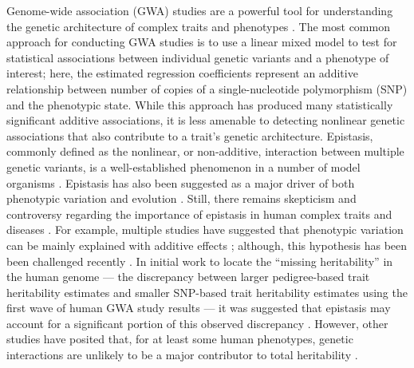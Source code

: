 \documentclass[10pt]{article}
\begin{document}
Genome-wide association (GWA) studies are a powerful tool for understanding the genetic architecture of complex traits and phenotypes \cite{Hirschhorn2005,McCarthy2008,Stranger2011,Yang2014,Pasaniuc2017,Visscher2017,Buniello2019,Tam2019}. The most common approach for conducting GWA studies is to use a linear mixed model to test for statistical associations between individual genetic variants and a phenotype of interest; here, the estimated regression coefficients represent an additive relationship between number of copies of a single-nucleotide polymorphism (SNP) and the phenotypic state. While this approach has produced many statistically significant additive associations, it is less amenable to detecting nonlinear genetic associations that also contribute to a trait's genetic architecture. Epistasis, commonly defined as the nonlinear, or non-additive, interaction between multiple genetic variants, is a well-established phenomenon in a number of model organisms \cite{Lehner2006,Rowe2008,Shao2008,Flint2009,Costanzo2010,He2010,Jarvis2011,Pettersson2011,Bloom2013,Monnahan2015}. Epistasis has also been suggested as a major driver of both phenotypic variation and evolution \cite{Carlborg2004,Carlborg2006,Martin2007,Phillips2008,Moore2009,Zuk2012,Jones2014,Mackay2014}. Still, there remains skepticism and controversy regarding the importance of epistasis in human complex traits and diseases \cite{Hill2008,Crow2010,Yang2010,Aschard2012,Powell2013,Maki-Tanila2014,Wood2014a,Yang2015}. For example, multiple studies have suggested that phenotypic variation can be mainly explained with additive effects \cite{Hill2008,Crow2010,Maki-Tanila2014}; although, this hypothesis has been been challenged recently \cite{Huang2016}. In initial work to locate the  ``missing heritability'' in the human genome --- the discrepancy between larger pedigree-based trait heritability estimates and smaller SNP-based trait heritability estimates using the first wave of human GWA study results \cite{Maher2008,Manolio2009,Eichler2010} --- it was suggested that epistasis may account for a significant portion of this observed discrepancy \cite{Slatkin2009,Zuk2012,Hemani2013}. However, other studies have posited that, for at least some human phenotypes, genetic interactions are unlikely to be a major contributor to total heritability \cite{Yang2015,Wainschtein2019,Roberts2020}.
\end{document}
